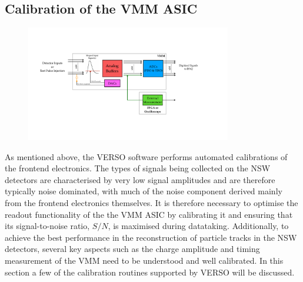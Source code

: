 \subsection{Calibration of the VMM ASIC}
\label{sec:calib_alg}

\begin{figure}[!htb]
    \begin{center}
        \includegraphics[width=0.8\textwidth]{figures/nsw/calibration/xadc_diagramPDF}
        \caption{
        }
        \label{fig:xadc_diagram}
    \end{center}
\end{figure}

As mentioned above, the VERSO software performs automated calibrations of
the frontend electronics.
The types of signals being collected on the NSW detectors are characterised by
very low signal amplitudes and are therefore typically noise dominated, with
much of the noise component derived mainly from the frontend electronics themselves.
It is therefore necessary to optimise the readout functionality of the
the VMM ASIC by calibrating it and ensuring that its signal-to-noise
ratio, $S/N$, is maximised during datataking.
Additionally, to achieve the best performance in the reconstruction of particle
tracks in the NSW detectors, several key aspects such as the charge amplitude
and timing measurement of the VMM need to be understood and well calibrated.
In this section a few of the calibration routines supported by VERSO will be discussed.

